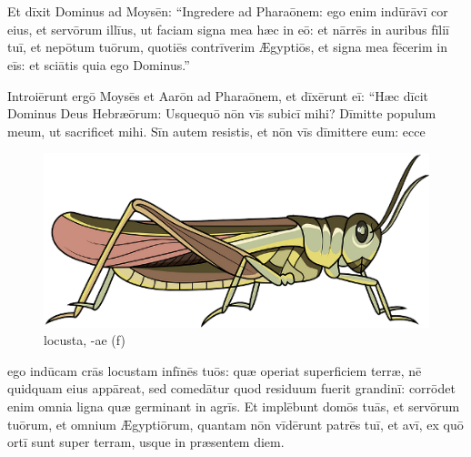 \chapter{}


\thispagestyle{empty}

Et dīxit Dominus ad Moysēn: ``Ingredere ad Pharaōnem: ego enim indūrāvī cor eius, et servōrum illīus, ut faciam signa mea hæc in eō:
et nārrēs in auribus fīliī tuī, et nepōtum tuōrum,
quotiēs contrīverim Ægyptiōs, et signa mea fēcerim in eīs:
et sciātis quia ego Dominus.''

 Introiērunt ergō
Moysēs et Aarōn ad Pharaōnem, et dīxērunt eī: ``Hæc dīcit
Dominus Deus Hebræōrum: Usquequō nōn vīs
subicī mihi? Dīmitte populum meum, ut
sacrificet mihi.  Sīn autem resistis, et nōn vīs dīmittere eum: ecce
\begin{figure}[ht]
    \centering
    \includegraphics{locusta}
    \caption{locusta, -ae (f)}
\end{figure}%
ego indūcam crās locustam in\linebreak fīnēs tuōs:  quæ operiat
superficiem terræ, nē quidquam eius appāreat, sed
comedātur quod residuum
fuerit grandinī: corrōdet enim omnia ligna quæ
germinant in agrīs.  Et implēbunt domōs tuās, et servōrum
tuōrum, et omnium Ægyptiōrum, quantam nōn vīdērunt patrēs tuī, et avī, ex
quō ortī sunt super terram, usque in præsentem diem. 

